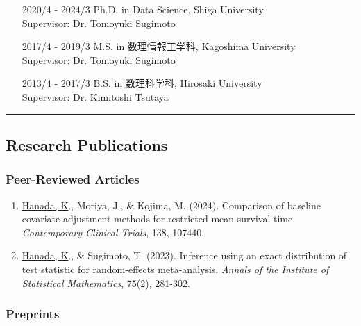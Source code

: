 \documentclass[
  12pt,
]{article}
\providecommand{\tightlist}{%
  \setlength{\itemsep}{0pt}\setlength{\parskip}{0pt}}
\begin{document}
\begin{itemize}[left=80pt, labelsep=1em, itemindent=0pt, label={}]
  \item[2020/4 - 2024/3] Ph.D. in Data Science, Shiga University \\
  Supervisor: Dr. Tomoyuki Sugimoto
  \item[2017/4 - 2019/3] M.S. in 数理情報工学科, Kagoshima University \\
  Supervisor: Dr. Tomoyuki Sugimoto
  \item[2013/4 - 2017/3] B.S. in 数理科学科, Hirosaki University  \\
  Supervisor: Dr. Kimitoshi Tsutaya
\end{itemize}

\begin{center}\rule{0.5\linewidth}{0.5pt}\end{center}

\hypertarget{research-publications}{%
\subsection{Research Publications}\label{research-publications}}

\hypertarget{peer-reviewed-articles}{%
\subsubsection{Peer-Reviewed Articles}\label{peer-reviewed-articles}}

\begin{enumerate}
\def\labelenumi{\arabic{enumi}.}
\tightlist
\item
  \underline{Hanada, K}., Moriya, J., \& Kojima, M. (2024). Comparison
  of baseline covariate adjustment methods for restricted mean survival
  time. \emph{Contemporary Clinical Trials}, 138, 107440.
\item
  \underline{Hanada, K}., \& Sugimoto, T. (2023). Inference using an
  exact distribution of test statistic for random-effects meta-analysis.
  \emph{Annals of the Institute of Statistical Mathematics}, 75(2),
  281-302.
\end{enumerate}

\hypertarget{preprints}{%
\subsubsection{Preprints}\label{preprints}}
\end{document}
